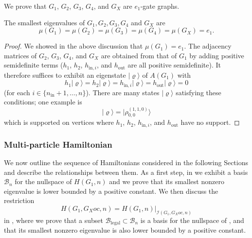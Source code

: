 \documentclass[../thesis-main/thesis-main]{subfiles}
\begin{document}
We prove that $G_1$, $G_2$, $G_3$, $G_4$, and $G_X$ are $e_1$-gate graphs.

\begin{lemma}
\label{lem:The-smallest-eigenvalues}The smallest eigenvalues of $G_{1},G_{2},G_{3},G_{4}$
and $G_X$ are 
\[
\mu(G_{1})=\mu(G_{2})=\mu(G_{3})=\mu(G_{4})=\mu(G_X)=e_{1}.
\]
\end{lemma}

\begin{proof}
We showed in the above discussion that $\mu(G_{1})=e_{1}$. The adjacency matrices of $G_{2}$, $G_{3}$, $G_{4}$, and $G_X$ are obtained from that of $G_{1}$ by adding positive semidefinite terms ($h_{1}$, $h_{2}$, $h_{\text{in},i}$, and $h_{\text{out}}$ are all positive semidefinite). It therefore suffices to exhibit an eigenstate $|\varrho\rangle$ of $A(G_{1})$ with
\[
  h_{1}|\varrho\rangle
  =h_{2}|\varrho\rangle
  =h_{\text{in},i}|\varrho\rangle
  =h_{\text{out}}|\varrho\rangle
  =0
\]
(for each $i\in\{n_{\text{in}}+1,\ldots,n\}$). There are many states $|\varrho\rangle$ satisfying these conditions; one example is
\[
|\varrho\rangle = |\rho_{0,0}^{(1,1,0)}\rangle
\]
which is supported on vertices where $h_{1}$, $h_{2}$, $h_{\text{in},i}$, and $h_{\text{out}}$ have no support.
\end{proof}

\subsubsection{Multi-particle Hamiltonian}
\label{sec:Building-up-the}

We now outline the sequence of Hamiltonians considered in the following Sections and describe the relationships between them. As a first step, in  we exhibit a basis $\mathcal{B}_{n}$ for the nullspace of $H(G_{1},n)$ and we prove that its smallest nonzero eigenvalue is lower bounded by a positive constant. We then discuss the restriction
\begin{equation}
  H(G_{1},G_Xoc,n)
  = H(G_{1},n)\big|_{\mathcal{I}\left(G_{1},G_Xoc,n\right)}
\label{eq:restriction}
\end{equation}
in , where we prove that a subset $\mathcal{B}_{\text{legal}}\subset\mathcal{B}_{n}$ is a basis for the nullspace of , and that its smallest nonzero eigenvalue is also lower bounded by a positive constant.
\end{document}

